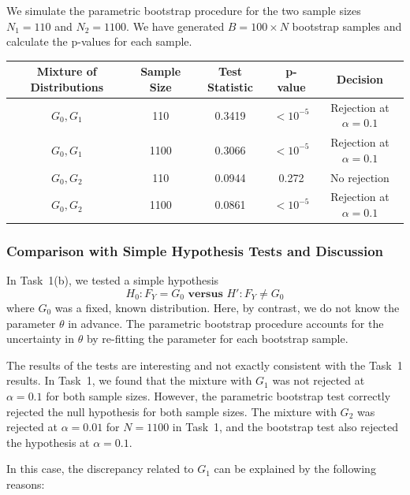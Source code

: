 \documentclass{article}
\begin{document}
We simulate the parametric bootstrap procedure for the two sample sizes \(N_1 = 110\) and \(N_2 = 1100\). We have generated \(B = 100 \times N\) bootstrap samples and calculate the p-values for each sample.

\begin{table}[h]
\centering
\begin{tabular}{|c|c|c|c|c|}
\hline
\textbf{Mixture of Distributions} & \textbf{Sample Size} & \textbf{Test Statistic} & \textbf{p-value} & \textbf{Decision} \\ \hline
\(G_0, G_1\) & 110 & 0.3419 & \(< 10^{-5}\) & Rejection at \(\alpha=0.1\) \\ \hline
\(G_0, G_1\) & 1100 & 0.3066 & \(< 10^{-5}\) & Rejection at \(\alpha=0.1\) \\ \hline
\(G_0, G_2\) & 110 & 0.0944 & 0.272 & No rejection \\ \hline
\(G_0, G_2\) & 1100 & 0.0861 & \(< 10^{-5}\) & Rejection at \(\alpha=0.1\) \\ \hline
\end{tabular}
\end{table}

\subsubsection{Comparison with Simple Hypothesis Tests and Discussion}

In Task~1(b), we tested a simple hypothesis
\[
H_0: F_Y = G_0 \textbf{ versus } H': F_Y \neq G_0
\]
where \(G_0\) was a fixed, known distribution. Here, by contrast, we do not know the parameter \(\theta\) in advance. The parametric bootstrap procedure accounts for the uncertainty in \(\theta\) by re-fitting the parameter for each bootstrap sample.

The results of the tests are interesting and not exactly consistent with the Task~1 results. In Task~1, we found that the mixture with \(G_1\) was not rejected at \(\alpha=0.1\) for both sample sizes. However, the parametric bootstrap test correctly rejected the null hypothesis for both sample sizes. The mixture with \(G_2\) was rejected at \(\alpha=0.01\) for \(N=1100\) in Task~1, and the bootstrap test also rejected the hypothesis at \(\alpha=0.1\).

In this case, the discrepancy related to \(G_1\) can be explained by the following reasons:
\end{document}
